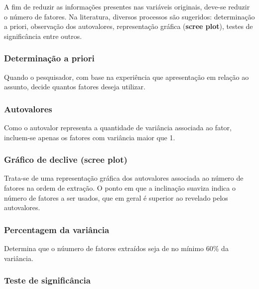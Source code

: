 \documentclass[12pt,brazil,oneside]{book}
\begin{document}
A fim de reduzir as informações presentes nas variáveis originais,
deve-se reduzir o número de fatores. Na literatura, diversos processos
são sugeridos: determinação a priori, observação dos autovalores,
representação gráfica (\textbf{scree plot}), testes de significância
entre outros.

\hypertarget{determinacao-a-priori}{%
\subsubsection{Determinação a priori}\label{determinacao-a-priori}}

Quando o pesquisador, com base na experiência que apresentação em
relação ao assunto, decide quantos fatores deseja utilizar.

\hypertarget{autovalores}{%
\subsubsection{Autovalores}\label{autovalores}}

Como o autovalor representa a quantidade de variância associada ao
fator, incluem-se apenas os fatores com variância maior que 1.

\hypertarget{grafico-de-declive-scree-plot}{%
\subsubsection{\texorpdfstring{Gráfico de declive (\textbf{scree
plot})}{Gráfico de declive (scree plot)}}\label{grafico-de-declive-scree-plot}}

Trata-se de uma representação gráfica dos autovalores associada ao
número de fatores na ordem de extração. O ponto em que a inclinação
suaviza indica o número de fatores a ser usados, que em geral é superior
ao revelado pelos autovalores.

\hypertarget{percentagem-da-variancia}{%
\subsubsection{Percentagem da
variância}\label{percentagem-da-variancia}}

Determina que o núumero de fatores extraídos seja de no mínimo 60\% da
variância.

\hypertarget{teste-de-significancia}{%
\subsubsection{Teste de significância}\label{teste-de-significancia}}
\end{document}
